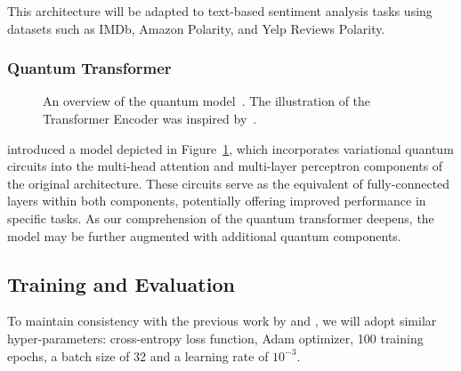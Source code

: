 This architecture will be adapted to text-based sentiment analysis
tasks using datasets such as IMDb, Amazon Polarity, and Yelp Reviews Polarity.

\subsubsection{Quantum Transformer}
\label{subsubsec:quantum_vision_transformer}

\begin{figure}[ht]
  \begin{center}
  \end{center}
  \vspace{-0.5cm}
  \caption{An overview of the quantum model~\cite{Cara_2023}. The
    illustration of the Transformer Encoder was inspired
  by~\citet{disipio2021dawn}.}
  \label{fig:qvit_architecture}
\end{figure}

\citet{Cara_2023} introduced a model depicted in
Figure~\ref{fig:qvit_architecture}, which incorporates variational
quantum circuits into the multi-head attention and multi-layer
perceptron components of the original architecture. These circuits
serve as the equivalent of fully-connected layers within both
components, potentially offering improved performance in specific
tasks. As our comprehension of the quantum transformer
deepens, the model may be further augmented with additional quantum components.

\subsection{Training and Evaluation}
\label{subsec:training_and_evaluation}

To maintain consistency with the previous work by \citet{Cara_2023}
and \citet{Cherrat_2024}, we will adopt similar hyper-parameters:
cross-entropy loss function, Adam optimizer, 100 training epochs, a
batch size of 32 and a learning rate of \(10^{-3}\).

